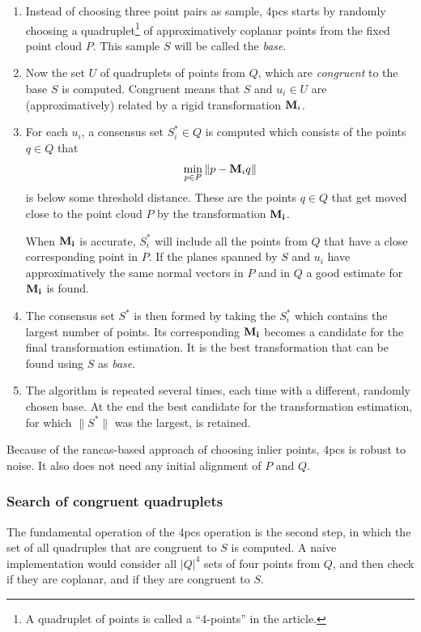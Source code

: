 \begin{enumerate}
\item Instead of choosing three point pairs as sample, \gls{4pcs} starts by randomly choosing a quadruplet\footnote{A quadruplet of points is called a ``4-points'' in the article.} of approximatively coplanar points from the fixed point cloud $P$. This sample $S$ will be called the \emph{base}.

\item Now the set $U$ of quadruplets of points from $Q$, which are \emph{congruent} to the base $S$ is computed. Congruent means that $S$ and $u_i \in U$ are (approximatively) related by a rigid transformation $\mathbf{M}_i$.

\item For each $u_i$, a consensus set $S^{*}_i \in Q$ is computed which consists of the points $q \in Q$ that
\begin{equation*}
\min_{p \in P} \| p - \mathbf{M}_i q \|
\end{equation*}
is below some threshold distance. These are the points $q \in Q$ that get moved close to the point cloud $P$ by the transformation $\mathbf{M_i}$.

When $\mathbf{M_i}$ is accurate, $S^{*}_i$ will include all the points from $Q$ that have a close corresponding point in $P$. If the planes spanned by $S$ and $u_i$ have approximatively the same normal vectors in $P$ and in $Q$ a good estimate for $\mathbf{M_i}$ is found.

\item The consensus set $S^{*}$ is then formed by taking the $S^{*}_i$ which contains the largest number of points. Its corresponding $\mathbf{M_i}$ becomes a candidate for the final transformation estimation. It is the best transformation that can be found using $S$ as \emph{base}. 

\item The algorithm is repeated several times, each time with a different, randomly chosen base. At the end the best candidate for the transformation estimation, for which $\| S^{*} \|$ was the largest, is retained.
\end{enumerate}


Because of the \gls{rancas}-based approach of choosing inlier points, \gls{4pcs} is robust to noise. It also does not need any initial alignment of $P$ and $Q$.


\subsubsection{Search of congruent quadruplets}
The fundamental operation of the \gls{4pcs} operation is the second step, in which the set of all quadruples that are congruent to $S$ is computed. A naive implementation would consider all $|Q|^4$ sets of four points from $Q$, and then check if they are coplanar, and if they are congruent to $S$.

